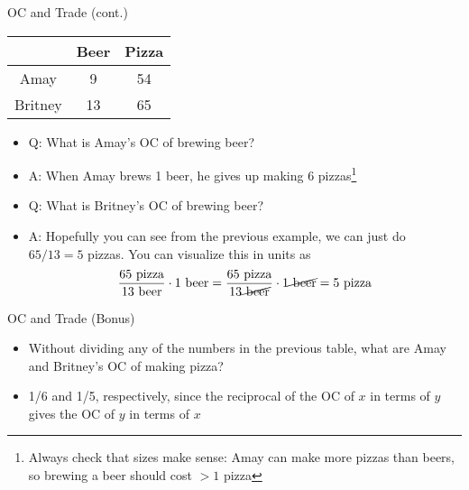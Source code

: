 \documentclass[10pt,xcolor={svgnames}]{beamer}
\begin{document}
\begin{frame}{OC and Trade (cont.)}
    \begin{table}[]
        \centering
        \begin{tabular}{c|c|c|} 
            & Beer & Pizza\\
            \hline
            Amay & 9 & 54 \\
            \hline
            Britney & 13 & 65\\
            \hline
        \end{tabular}
    \end{table}
\begin{itemize}[<+>]
    \item Q: What is Amay's OC of brewing beer?
    \item A: When Amay brews 1 beer, he gives up making 6 pizzas\footnote<2->{\vspace{2mm}Always check that sizes make sense: Amay can make more pizzas than beers, so brewing a beer should cost $>1$ pizza}
    \item Q: What is Britney's OC of brewing beer?
    \item A: Hopefully you can see from the previous example, we can just do $65/13=5$ pizzas. You can visualize this in units as 
    $$\frac{65 \text{ pizza}}{13\text{ beer}}\cdot 1\text{ beer}=\frac{65 \text{ pizza}}{13\cancel{\text{ beer}}}\cdot 1\cancel{\text{ beer}}=5\text{ pizza}$$
\end{itemize}
\end{frame}

\begin{frame}{OC and Trade (Bonus)}
\begin{itemize}[<+>]
    \item Without dividing any of the numbers in the previous table, what are Amay and Britney's OC of making pizza?
    \item 1/6 and 1/5, respectively, since the reciprocal of the OC of $x$ in terms of $y$ gives the OC of $y$ in terms of $x$
\end{itemize}
\end{frame}
\end{document}
